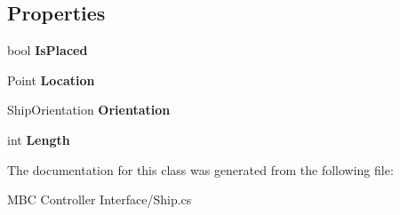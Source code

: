 \subsection*{Properties}
\begin{DoxyCompactItemize}
\item 
\hypertarget{class_m_b_c_core_1_1_ship_a70c0826df620f52ffc95feb8bc9aa400}{bool {\bfseries Is\-Placed}}\label{class_m_b_c_core_1_1_ship_a70c0826df620f52ffc95feb8bc9aa400}

\item 
\hypertarget{class_m_b_c_core_1_1_ship_af1e9948e721d0aaf92ca2b921bf76a37}{Point {\bfseries Location}}\label{class_m_b_c_core_1_1_ship_af1e9948e721d0aaf92ca2b921bf76a37}

\item 
\hypertarget{class_m_b_c_core_1_1_ship_ac1c9d75f8a03fccc012801c6be6fffc5}{Ship\-Orientation {\bfseries Orientation}}\label{class_m_b_c_core_1_1_ship_ac1c9d75f8a03fccc012801c6be6fffc5}

\item 
\hypertarget{class_m_b_c_core_1_1_ship_a5d5a2d7f5476936d42d266ba954909ff}{int {\bfseries Length}}\label{class_m_b_c_core_1_1_ship_a5d5a2d7f5476936d42d266ba954909ff}

\end{DoxyCompactItemize}


The documentation for this class was generated from the following file\-:\begin{DoxyCompactItemize}
\item 
M\-B\-C Controller Interface/Ship.\-cs\end{DoxyCompactItemize}
